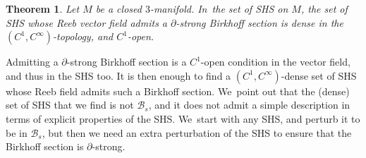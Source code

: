 \documentclass[10pt]{amsart}
\newcommand{\threemanifold}{$3$\nobreakdash-mani\-fold\xspace}
\newtheorem{theorem}{Theorem}[section]
\theoremstyle{definition}
\begin{document}
\begin{theorem}\label{thm:C1generic}
Let $M$ be a closed \threemanifold. In~the set of SHS on $M$, the set of SHS whose Reeb vector field admits a $\partial$-strong Birkhoff section is dense in the $(C^1,C^\infty)$-topology, and $C^1$-open.
\end{theorem}

Admitting a $\partial$-strong Birkhoff section is a $C^1$-open condition in the vector field, and thus in the SHS too. It is then enough to find a $(C^1,C^\infty)$-dense set of SHS whose Reeb field admits such a Birkhoff section. We~point out that the (dense) set of SHS that we find is not $\mathcal{B}_s$, and it does not admit a simple description in terms of explicit properties of the SHS. We~start with any SHS, and perturb it to be in $\mathcal{B}_s$, but then we need an extra perturbation of the SHS to ensure that the Birkhoff section is $\partial$-strong.
\end{document}
